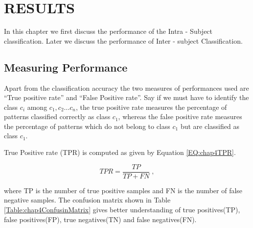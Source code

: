 \chapter{RESULTS}
\label{chap-four}
	In this chapter we first discuss the performance of the Intra - Subject classification. Later we discuss the performance of Inter - subject Classification.
    
    \section{Measuring Performance}
    
    Apart from the classification accuracy the two measures of performances used are ``True positive rate'' and ``False Positive rate''. Say if we must have to identify the class $c_i$ among $c_1, c_2 \dots c_n$, the true positive rate measures the percentage of patterns classified correctly as class $c_1$, whereas the false positive rate measures the percentage of patterns which do not belong to class $c_1$ but are classified as class $c_1$.
    
    True Positive rate (TPR) is computed as given by Equation \ref{EQ:chap4TPR}.
    
    \begin{equation}
    	TPR = \frac{TP}{TP + FN} \;,
    	\label{EQ:chap4TPR}
    \end{equation}
    
    \noindent where TP is the number of true positive samples and FN is the number of false negative samples. The confusion matrix shown in Table \ref{Table:chap4ConfusinMatrix} gives better understanding of true positives(TP), false positives(FP), true negatives(TN) and false negatives(FN).
    
